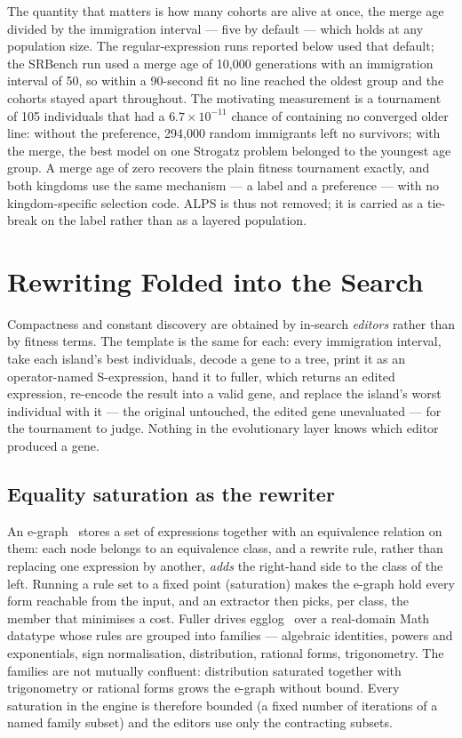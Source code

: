 \documentclass[sigconf,nonacm]{acmart}
\newcommand{\ty}[1]{\textsf{#1}}
\begin{document}
The quantity that matters is how many cohorts are alive at once, the merge age
divided by the immigration interval --- five by default --- which holds at any
population size. The regular-expression runs reported below used that default;
the SRBench run used a merge age of 10{,}000 generations with an immigration
interval of 50, so within a 90-second fit no line reached the oldest group and
the cohorts stayed apart throughout. The motivating measurement is a tournament of 105 individuals
that had a $6.7\times10^{-11}$ chance of containing no converged older line:
without the preference, 294{,}000 random immigrants left no survivors; with the
merge, the best model on one Strogatz problem belonged to the youngest age
group.
A merge age of zero recovers the plain fitness tournament exactly, and both
kingdoms use the same mechanism --- a label and a preference --- with no
kingdom-specific selection code. ALPS is thus not removed; it is carried as a
tie-break on the label rather than as a layered population.

\section{Rewriting Folded into the Search}
\label{sec:editors}

Compactness and constant discovery are obtained by in-search \emph{editors}
rather than by fitness terms. The template is the same for each: every
immigration interval, take each island's best individuals, decode a gene to a tree, print it
as an operator-named S-expression, hand it to fuller, which returns an edited
expression, re-encode the result into a valid gene, and replace the island's
worst individual with it --- the original untouched, the edited gene unevaluated
--- for the tournament to judge. Nothing in the evolutionary layer knows which
editor produced a gene.

\subsection{Equality saturation as the rewriter}

An e-graph~\cite{tate2009equality,willsey2021egg} stores a set of expressions
together with an equivalence relation on them: each node belongs to an
equivalence class, and a rewrite rule, rather than replacing one expression by
another, \emph{adds} the right-hand side to the class of the left. Running a rule
set to a fixed point (saturation) makes the e-graph hold every form reachable
from the input, and an extractor then picks, per class, the member that minimises
a cost. Fuller drives egglog~\cite{egglog} over a real-domain \ty{Math} datatype
whose rules are grouped into families --- algebraic identities, powers and
exponentials, sign normalisation, distribution, rational forms, trigonometry.
The families are not mutually confluent: distribution saturated together with
trigonometry or rational forms grows the e-graph without bound. Every saturation
in the engine is therefore bounded (a fixed number of iterations of a named
family subset) and the editors use only the contracting subsets.
\end{document}
